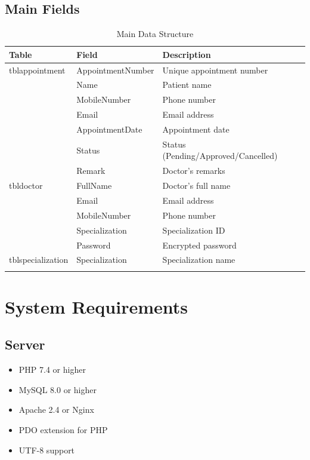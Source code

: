 \documentclass[12pt,a4paper]{report}
\begin{document}
\subsection{Main Fields}
\begin{longtable}{|p{3cm}|p{4cm}|p{6cm}|}
\hline
\textbf{Table} & \textbf{Field} & \textbf{Description} \\
\hline
\endhead

tblappointment & AppointmentNumber & Unique appointment number \\
\hline
& Name & Patient name \\
\hline
& MobileNumber & Phone number \\
\hline
& Email & Email address \\
\hline
& AppointmentDate & Appointment date \\
\hline
& Status & Status (Pending/Approved/Cancelled) \\
\hline
& Remark & Doctor's remarks \\
\hline

tbldoctor & FullName & Doctor's full name \\
\hline
& Email & Email address \\
\hline
& MobileNumber & Phone number \\
\hline
& Specialization & Specialization ID \\
\hline
& Password & Encrypted password \\
\hline

tblspecialization & Specialization & Specialization name \\
\hline
\caption{Main Data Structure}
\end{longtable}

\section{System Requirements}

\subsection{Server}
\begin{itemize}
    \item PHP 7.4 or higher
    \item MySQL 8.0 or higher
    \item Apache 2.4 or Nginx
    \item PDO extension for PHP
    \item UTF-8 support
\end{itemize}
\end{document}
